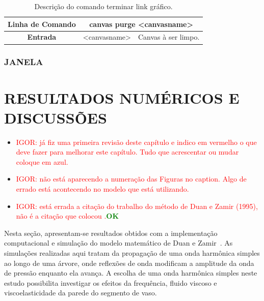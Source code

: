 \documentclass[a4paper,12pt]{monografia}
\theoremstyle{plain}
\theoremstyle{definition}
\theoremstyle{remark}
\begin{document}
\begin{center}
	\begin{table}[!htbp]
		\begin{tabular}{|c|c|m{}|}
			\hline
			\textbf{Linha de Comando} & \multicolumn{2}{c|}{canvas purge <canvas\underline{\space\space}name>} \\
			\hline
			\textbf{Entrada} & <canvas\underline{\space\space}name> & Canvas à ser limpo. \\
			\hline
		\end{tabular}
		\caption{Descrição do comando terminar link gráfico.}
		\label{tab:graphic_purge}
	\end{table}
\end{center}

\subsection{JANELA}\label{sec:janela}

\chapter{RESULTADOS NUMÉRICOS E DISCUSSÕES}

\begin{itemize}
	\item \textcolor{red}{IGOR: já fiz uma primeira revisão deste capítulo e indico em vermelho o que deve fazer para melhorar este capítulo. Tudo que acrescentar ou mudar coloque em azul.}
	\item \textcolor{red}{IGOR: não está aparecendo a numeração das Figuras no caption. Algo de errado está acontecendo no modelo que está utilizando.}
	\item \textcolor{red}{IGOR: está errada a citação do trabalho do método de Duan e Zamir (1995), não é a citação que colocou \cite{Duan}.}\textcolor{green}{\textbf{OK}}
\end{itemize}

Nesta seção, apresentam-se resultados obtidos com a implementação computacional e simulação do modelo matemático de Duan e Zamir~\cite{Duan1992}. As simulações realizadas aqui tratam da propagação de uma onda harmônica simples ao longo de uma árvore, onde reflexões de onda modificam a amplitude da onda de pressão enquanto ela avança. A escolha de uma onda harmônica simples neste estudo possibilita investigar os efeitos da frequência, fluido viscoso e viscoelasticidade da parede do segmento de vaso.
\end{document}
